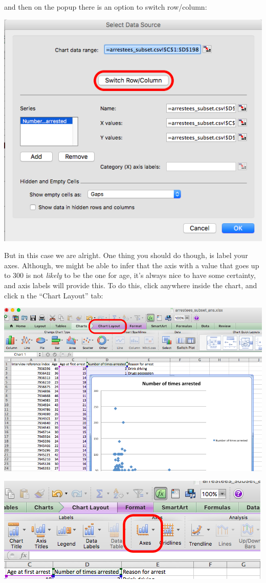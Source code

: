 \documentclass[
]{book}
\begin{document}
and then on the popup there is an option to switch row/column:

\includegraphics{imgs/scatter_5.png}

But in this case we are alright. One thing you should do though, is label your axes. Although, we might be able to infer that the axis with a value that goes up to 300 is not \emph{likely} to be the one for age, it's always nice to have some certainty, and axis labels will provide this. To do this, click anywhere inside the chart, and click n the ``Chart Layout'' tab:

\includegraphics{imgs/scatter_6.png}

\includegraphics{imgs/scatter_7.png}
\end{document}
